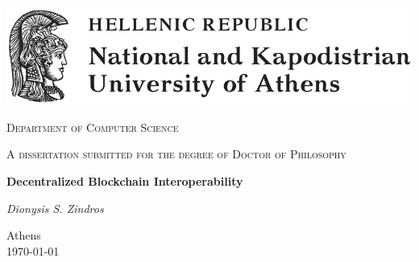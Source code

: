\begin{titlepage}
  \centering
  \includegraphics[width=\textwidth]{figures/uoa.pdf}\par\vspace{1cm}
  {\scshape\Large Department of Computer Science\par}
  \vspace{1cm}
  {\scshape A dissertation submitted for the degree of Doctor of Philosophy\par}
  \vspace{1cm}
  {\huge\bfseries Decentralized Blockchain Interoperability\par}
  \vspace{2cm}
  {\Large\itshape Dionysis \ifuniversity S. \fi Zindros\par}
	\vfill
	{\large Athens\\\today\par}
\end{titlepage}

